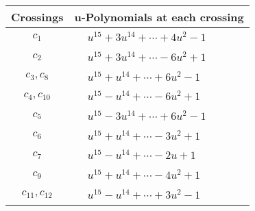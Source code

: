 \documentclass[1p]{elsarticle_modified}
\theoremstyle{definition}
\begin{document}
\begin{tabular}{m{50pt}|m{274pt}}
Crossings & \hspace{64pt}u-Polynomials at each crossing \\
\hline $$\begin{aligned}c_{1}\end{aligned}$$&$\begin{aligned}
&u^{15}+3 u^{14}+\cdots+4 u^2-1
\end{aligned}$\\
\hline $$\begin{aligned}c_{2}\end{aligned}$$&$\begin{aligned}
&u^{15}+3 u^{14}+\cdots-6 u^2+1
\end{aligned}$\\
\hline $$\begin{aligned}c_{3},c_{8}\end{aligned}$$&$\begin{aligned}
&u^{15}+u^{14}+\cdots+6 u^2-1
\end{aligned}$\\
\hline $$\begin{aligned}c_{4},c_{10}\end{aligned}$$&$\begin{aligned}
&u^{15}- u^{14}+\cdots-6 u^2+1
\end{aligned}$\\
\hline $$\begin{aligned}c_{5}\end{aligned}$$&$\begin{aligned}
&u^{15}-3 u^{14}+\cdots+6 u^2-1
\end{aligned}$\\
\hline $$\begin{aligned}c_{6}\end{aligned}$$&$\begin{aligned}
&u^{15}+u^{14}+\cdots-3 u^2+1
\end{aligned}$\\
\hline $$\begin{aligned}c_{7}\end{aligned}$$&$\begin{aligned}
&u^{15}- u^{14}+\cdots-2 u+1
\end{aligned}$\\
\hline $$\begin{aligned}c_{9}\end{aligned}$$&$\begin{aligned}
&u^{15}+u^{14}+\cdots-4 u^2+1
\end{aligned}$\\
\hline $$\begin{aligned}c_{11},c_{12}\end{aligned}$$&$\begin{aligned}
&u^{15}- u^{14}+\cdots+3 u^2-1
\end{aligned}$\\
\hline
\end{tabular}\\~\\
\end{document}
